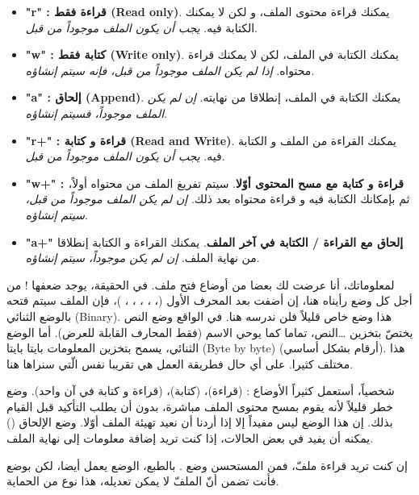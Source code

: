 \begin{itemize}
  \item \textbf{"\textenglish{r}" :
قراءة فقط
(\textenglish{Read only})}.
يمكنك قراءة محتوى الملف، و لكن لا يمكنك الكتابة فيه.
\textit{يجب أن يكون الملف موجوداً من قبل}.
  \item \textbf{"\textenglish{w}" :
كتابة فقط
(\textenglish{Write only})}.
يمكنك الكتابة في الملف، لكن لا يمكنك قراءة محتواه.
\textit{إذا لم يكن الملف موجوداً من قبل، فإنه سيتم إنشاؤه}.
  \item \textbf{"\textenglish{a}" :
إلحاق
(\textenglish{Append})}.
يمكنك الكتابة في الملف، إنطلاقا من نهايته.
\textit{إن لم يكن الملف موجوداً، فسيتم إنشاؤه}.
  \item \textbf{"\textenglish{r+}" :
قراءة و كتابة
(\textenglish{Read and Write})}.
يمكنك القراءة من الملف و الكتابة فيه.
\textit{يجب أن يكون الملف موجوداً من قبل}.
  \item \textbf{"\textenglish{w+}" :
قراءة و كتابة مع مسح المحتوى أوّلا}.
سيتم تفريغ الملف من محتواه أولاً، ثم بإمكانك الكتابة فيه و قراءة محتواه بعد ذلك.
\textit{إن لم يكن الملف موجوداً من قبل، سيتم إنشاؤه}.
  \item \textbf{"\textenglish{a+}"
إلحاق مع القراءة / الكتابة في آخر الملف}.
يمكنك القراءة و الكتابة إنطلاقا من نهاية الملف.
\textit{إن لم يكن موجوداً، سيتم إنشاؤه}.
\end{itemize}

لمعلوماتك، أنا عرضت لك بعضا من أوضاع فتح ملف. في الحقيقة، يوجد ضعفها !
من أجل كل وضع رأيناه هنا، إن أضفت
بعد المحرف الأول
(، ، ، ، ، )،
فإن الملف سيتم فتحه بالوضع الثنائي
(\textenglish{Binary}).
هذا وضع خاص قليلاً فلن ندرسه هنا. في الواقع وضع النص يختصّ بتخزين \dots النص، تماما كما يوحي الاسم (فقط المحارف القابلة للعرض). أما الوضع الثنائي، يسمح بتخزين المعلومات
بايتا بايتا
(\textenglish{Byte by byte})
(أرقام بشكل أساسي). هذا مختلف كثيرا. على أي حال فطريقة العمل هي تقريبا نفس الّتي سنراها هنا.

شخصياً، أستعمل كثيراً الأوضاع :
(قراءة)،
(كتابة)،
(قراءة و كتابة في آن واحد). وضع
خطر قليلاً لأنه يقوم بمسح محتوى الملف مباشرة، بدون أن يطلب التأكيد قبل القيام بذلك. إن هذا الوضع ليس مفيداً إلا إذا أردنا أن نعيد تهيئة الملف أوّلا.
وضع الإلحاق
()
يمكنه أن يفيد في بعض الحالات، إذا كنت تريد إضافة معلومات إلى نهاية الملف.

\begin{information}
  إن كنت تريد قراءة ملفّ، فمن المستحسن وضع
.
بالطبع، الوضع
يعمل أيضا، لكن بوضع
فأنت تضمن أنّ الملفّ لا يمكن تعديله، هذا نوع من الحماية.
\end{information}

